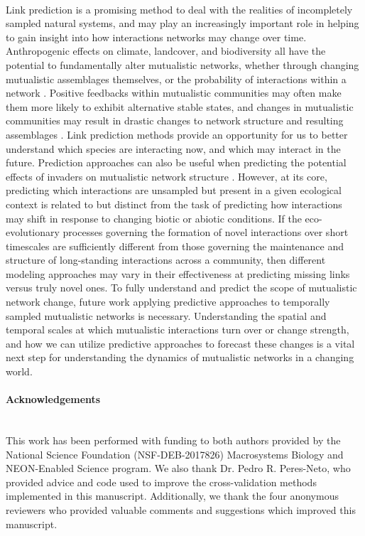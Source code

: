 \paragraph*{}
Link prediction is a promising method to deal with the realities of incompletely sampled natural systems, and may play an increasingly important role in helping to gain insight into how interactions networks may change over time. Anthropogenic effects on climate, landcover, and biodiversity all have the potential to fundamentally alter mutualistic networks, whether through changing mutualistic assemblages themselves, or the probability of interactions within a network \parencite{memmott2007global, tylianakis2017, teixido2022anthropogenic}. Positive feedbacks within mutualistic communities may often make them more likely to exhibit alternative stable states, and changes in mutualistic communities may result in drastic changes to network structure and resulting assemblages \parencite{lever2014sudden, bascompte2023resilience}. Link prediction methods provide an opportunity for us to better understand which species are interacting now, and which may interact in the future. Prediction approaches can also be useful when predicting the potential effects of invaders on mutualistic network structure \parencite{traveset2014mutualistic, fricke2020accelerating}. However, at its core, predicting which interactions are unsampled but present in a given ecological context is related to but distinct from the task of predicting how interactions may shift in response to changing biotic or abiotic conditions. If the eco-evolutionary processes governing the formation of novel interactions over short timescales are sufficiently different from those governing the maintenance and structure of long-standing interactions across a community, then different modeling approaches may vary in their effectiveness at predicting missing links versus truly novel ones. To fully understand and predict the scope of mutualistic network change, future work applying predictive approaches to temporally sampled mutualistic networks is necessary. Understanding the spatial and temporal scales at which mutualistic interactions turn over or change strength, and how we can utilize predictive approaches to forecast these changes is a vital next step for understanding the dynamics of mutualistic networks in a changing world. \\

\paragraph*{Acknowledgements}\mbox{}\\
This work has been performed with funding to both authors provided by the National Science Foundation (NSF-DEB-2017826) Macrosystems Biology and NEON-Enabled Science program. We also thank Dr. Pedro R. Peres-Neto, who provided advice and code used to improve the cross-validation methods implemented in this manuscript. Additionally, we thank the four anonymous reviewers who provided valuable comments and suggestions which improved this manuscript. 
\\

